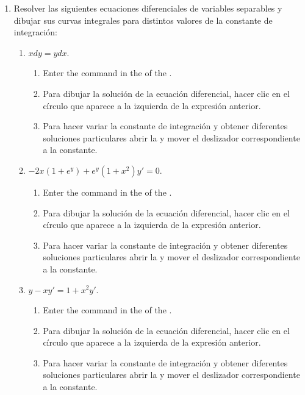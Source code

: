 \begin{enumerate}[leftmargin=*]
\item Resolver las siguientes ecuaciones diferenciales de variables separables y dibujar sus curvas integrales para distintos valores de la constante de integración:
      \begin{enumerate}
      \item $xdy=ydx$.
            \begin{indication}
            \begin{enumerate}
            \item Enter the command  in the  of the .
            \item Para dibujar la solución de la ecuación diferencial, hacer clic en el círculo que aparece a la izquierda de la expresión anterior.
            \item Para hacer variar la constante de integración y obtener diferentes soluciones particulares abrir la  y mover el deslizador correspondiente a la constante.
            \end{enumerate}
            \end{indication}

      \item $-2x(1+e^y)+e^y(1+x^{2})y'=0$.
            \begin{indication}
            \begin{enumerate}
            \item Enter the command  in the  of the .
            \item Para dibujar la solución de la ecuación diferencial, hacer clic en el círculo que aparece a la izquierda de la expresión anterior.
            \item Para hacer variar la constante de integración y obtener diferentes soluciones particulares abrir la  y mover el deslizador correspondiente a la constante.
            \end{enumerate}
            \end{indication}

      \item $y-xy'=1+x^2y'$.
            \begin{indication}
            \begin{enumerate}
            \item Enter the command  in the  of the .
            \item Para dibujar la solución de la ecuación diferencial, hacer clic en el círculo que aparece a la izquierda de la expresión anterior.
            \item Para hacer variar la constante de integración y obtener diferentes soluciones particulares abrir la  y mover el deslizador correspondiente a la constante.
            \end{enumerate}
            \end{indication}
      \end{enumerate}



\end{enumerate}
